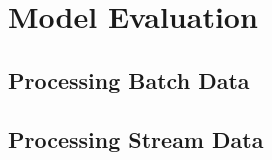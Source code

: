 \section{Model Evaluation}


\subsection{Processing Batch Data}


\subsection{Processing Stream Data}
